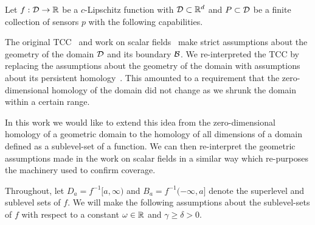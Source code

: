 
Let $f:{\mathcal{D}}\to\mathbb{R}$ be a $c$-Lipschitz function with ${\mathcal{D}}\subset\mathbb{R}^d$ and $P\subset {\mathcal{D}}$ be a finite collection of sensors $p$ with the following capabilities.

\vspace{3ex}
\begin{center}
\setlength{\fboxsep}{2ex}
\end{center}\vspace{3ex}

The original TCC~\cite{desilva07coverage} and work on scalar fields~\cite{chazal09analysis} make strict assumptions about the geometry of the domain ${\mathcal{D}}$ and its boundary ${\mathcal{B}}$.
We re-interpreted the TCC by replacing the assumptions about the geometry of the domain with assumptions about its persistent homology~\cite{cavanna2017when}.
This amounted to a requirement that the zero-dimensional homology of the domain did not change as we shrunk the domain within a certain range.

In this work we would like to extend this idea from the zero-dimensional homology of a geometric domain to the homology of all dimensions of a domain defined as a sublevel-set of a function.
We can then re-interpret the geometric assumptions made in the work on scalar fields in a similar way which re-purposes the machinery used to confirm coverage.

Throughout, let $D_a = f^{-1}[a, \infty)$ and $B_a = f^{-1}(-\infty, a]$  denote the superlevel and sublevel sets of $f$.
We will make the following assumptions about the sublevel-sets of $f$ with respect to a constant $\omega\in\mathbb{R}$ and $\gamma\geq \delta > 0$.


